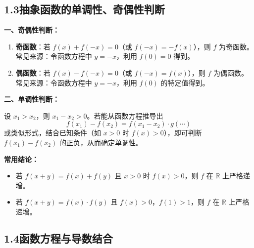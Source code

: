 \documentclass[12pt,a4paper]{ctexart}
\begin{document}
\subsection*{1.3\quad 抽象函数的单调性、奇偶性判断}

\begin{knowledgebox}[利用函数方程判断性质]
\textbf{一、奇偶性判断：}

\begin{enumerate}[label=(\arabic*)]
  \item \textbf{奇函数}：若 $f(x)+f(-x)=0$（或 $f(-x)=-f(x)$），则 $f$ 为奇函数。\\
    常见来源：令函数方程中 $y=-x$，利用 $f(0)=0$ 得到。
  \item \textbf{偶函数}：若 $f(x)-f(-x)=0$（或 $f(-x)=f(x)$），则 $f$ 为偶函数。\\
    常见来源：令函数方程中 $y=-x$，利用 $f(0)$ 的特定值得到。
\end{enumerate}

\medskip
\textbf{二、单调性判断：}

\medskip
设 $x_1>x_2$，则 $x_1-x_2>0$。若能从函数方程推导出
\[f(x_1)-f(x_2)=f(x_1-x_2)\cdot g(\cdots)\]
或类似形式，结合已知条件（如 $x>0$ 时 $f(x)>0$），即可判断 $f(x_1)-f(x_2)$ 的正负，从而确定单调性。

\medskip
\textbf{常用结论：}
\begin{itemize}
  \item 若 $f(x+y)=f(x)+f(y)$ 且 $x>0$ 时 $f(x)>0$，则 $f$ 在 $\mathbb{R}$ 上严格递增。
  \item 若 $f(x+y)=f(x)\cdot f(y)$ 且 $f(x)>0$，$f(1)>1$，则 $f$ 在 $\mathbb{R}$ 上严格递增。
\end{itemize}
\end{knowledgebox}

\subsection*{1.4\quad 函数方程与导数结合}
\end{document}
